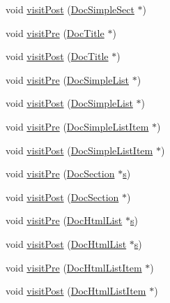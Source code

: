 \begin{DoxyCompactItemize}
\item 
void \hyperlink{class_man_doc_visitor_ad04b49e411c456cbd5da762c96dca233}{visit\+Post} (\hyperlink{class_doc_simple_sect}{Doc\+Simple\+Sect} $\ast$)
\item 
void \hyperlink{class_man_doc_visitor_a0365148847acb44c9a526249991a2a46}{visit\+Pre} (\hyperlink{class_doc_title}{Doc\+Title} $\ast$)
\item 
void \hyperlink{class_man_doc_visitor_a073e155fa1273a3d332166f0cf3d7721}{visit\+Post} (\hyperlink{class_doc_title}{Doc\+Title} $\ast$)
\item 
void \hyperlink{class_man_doc_visitor_ae5e4161ebc481408d3be81bf4a323c30}{visit\+Pre} (\hyperlink{class_doc_simple_list}{Doc\+Simple\+List} $\ast$)
\item 
void \hyperlink{class_man_doc_visitor_a4dc9ef46a00302a577c26a96303db04e}{visit\+Post} (\hyperlink{class_doc_simple_list}{Doc\+Simple\+List} $\ast$)
\item 
void \hyperlink{class_man_doc_visitor_a9e22c8905c481b36fc8a786e07f27d59}{visit\+Pre} (\hyperlink{class_doc_simple_list_item}{Doc\+Simple\+List\+Item} $\ast$)
\item 
void \hyperlink{class_man_doc_visitor_a6e316b030c2ce02fa6f10628699d07a9}{visit\+Post} (\hyperlink{class_doc_simple_list_item}{Doc\+Simple\+List\+Item} $\ast$)
\item 
void \hyperlink{class_man_doc_visitor_a9e33eca3d62adf42fb24a3f8009647bc}{visit\+Pre} (\hyperlink{class_doc_section}{Doc\+Section} $\ast$\hyperlink{060__command__switch_8tcl_a011c73f2dbb87635a3b4206c72355f6e}{s})
\item 
void \hyperlink{class_man_doc_visitor_ad48c62312a049df3ed9f37cce7dcaee4}{visit\+Post} (\hyperlink{class_doc_section}{Doc\+Section} $\ast$)
\item 
void \hyperlink{class_man_doc_visitor_abd9473fd9bc149f1e08ec4baea38c2dd}{visit\+Pre} (\hyperlink{class_doc_html_list}{Doc\+Html\+List} $\ast$\hyperlink{060__command__switch_8tcl_a011c73f2dbb87635a3b4206c72355f6e}{s})
\item 
void \hyperlink{class_man_doc_visitor_a0ed34c75c073014b27f73d5641f00505}{visit\+Post} (\hyperlink{class_doc_html_list}{Doc\+Html\+List} $\ast$\hyperlink{060__command__switch_8tcl_a011c73f2dbb87635a3b4206c72355f6e}{s})
\item 
void \hyperlink{class_man_doc_visitor_a67595af3a1d78f9d08a445f12b01b4fa}{visit\+Pre} (\hyperlink{class_doc_html_list_item}{Doc\+Html\+List\+Item} $\ast$)
\item 
void \hyperlink{class_man_doc_visitor_a95ca8e67415f7189d1df6cad1f2bbfa9}{visit\+Post} (\hyperlink{class_doc_html_list_item}{Doc\+Html\+List\+Item} $\ast$)

\end{DoxyCompactItemize}
